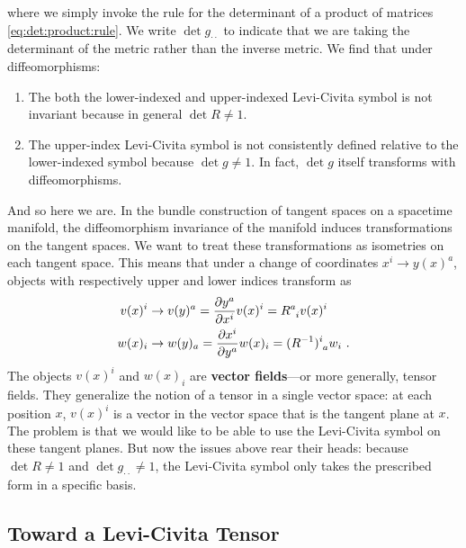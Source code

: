 \begin{subappendices}
where we simply invoke the rule for the determinant of a product of matrices \eqref{eq:det:product:rule}. We write $\det g_{\cdot\cdot}$ to indicate that we are taking the determinant of the metric rather than the inverse metric. We find that under diffeomorphisms:
\begin{enumerate}
    \item The both the lower-indexed and upper-indexed Levi-Civita symbol is not invariant because in general $\det R \neq 1$.
    \item The upper-index Levi-Civita symbol is not consistently defined relative to the lower-indexed symbol because $\det g \neq 1$. In fact, $\det g$ itself transforms with diffeomorphisms.
\end{enumerate}
And so here we are. In the bundle construction of tangent spaces on a spacetime manifold, the diffeomorphism invariance of the manifold induces transformations on the tangent spaces. We want to treat these transformations as isometries on each tangent space. This means that under a change of coordinates $x^i \to y(x)^a$, objects with respectively upper and lower indices transform as
\begin{align}
    v(x)^i &\to v(y)^a = \frac{\partial y^a}{\partial x^i} v(x)^i
    = R\aij{a}{i}v(x)^i
    \\
    w(x)_i &\to w(y)_a = \frac{\partial x^i}{\partial y^a} w(x)_i 
    = (R\inv)\aij{i}{a}w_i 
    \ .
\end{align}
The objects $v(x)^i$ and $w(x)_i$ are \textbf{vector fields}---or more generally, tensor fields. They generalize the notion of a tensor in a single vector space: at each position $x$, $v(x)^i$ is a vector in the vector space that is the tangent plane at $x$. The problem is that we would like to be able to use the Levi-Civita symbol on these tangent planes. But now the issues above rear their heads: because $\det R \neq 1$ and $\det g_{\cdot\cdot} \neq 1$, the Levi-Civita symbol only takes the prescribed form in a specific basis. 

\subsection{Toward a Levi-Civita Tensor}


\end{subappendices}
